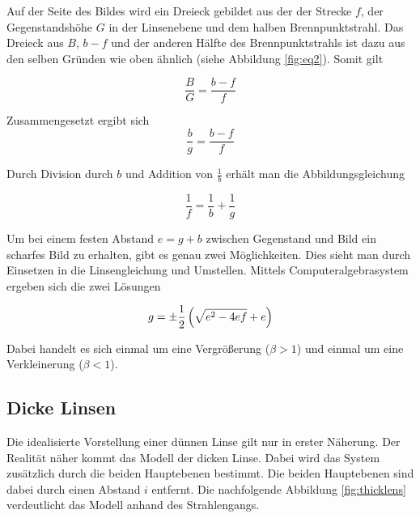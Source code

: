 \documentclass[a4paper,german,12pt,smallheadings]{scrartcl}
\begin{document}
Auf der Seite des Bildes wird ein Dreieck gebildet aus der der Strecke
$f$, der Gegenstandshöhe $G$ in der Linsenebene und dem halben
Brennpunktstrahl. Das Dreieck aus $B$, $b-f$ und der anderen Hälfte des
Brennpunktstrahls ist dazu aus den selben Gründen wie oben ähnlich (siehe
Abbildung \ref{fig:eq2}). Somit gilt

\begin{equation*}
  \frac{B}{G} = \frac{b-f}{f}
\end{equation*}

Zusammengesetzt ergibt sich
\begin{equation}
  \frac{b}{g} = \frac{b-f}{f}
  \label{eq:inter}
\end{equation}

Durch Division durch $b$ und Addition von $\frac{1}{b}$ erhält man die
Abbildungsgleichung

\begin{equation}
  \frac{1}{f} = \frac{1}{b} + \frac{1}{g}
\end{equation}

Um bei einem festen Abstand $e = g+b$ zwischen Gegenstand und Bild ein scharfes
Bild zu erhalten, gibt es genau zwei Möglichkeiten. Dies sieht man durch
Einsetzen in die Linsengleichung und Umstellen. Mittels Computeralgebrasystem
ergeben sich die zwei Lösungen

\begin{equation}
  g = \pm \frac{1}{2} \del{\sqrt{e^2 - 4ef} + e}
\end{equation}

Dabei handelt es sich einmal um eine Vergrößerung ($\beta > 1$) und einmal um
eine Verkleinerung ($\beta < 1$).


\subsection{Dicke Linsen}

Die idealisierte Vorstellung einer dünnen Linse gilt nur in erster Näherung.
Der Realität näher kommt das Modell der dicken Linse. Dabei wird das System
zusätzlich durch die beiden Hauptebenen bestimmt. Die beiden Hauptebenen sind
dabei durch einen Abstand $i$ entfernt. Die nachfolgende Abbildung
\ref{fig:thicklens} verdeutlicht das Modell anhand des Strahlengangs.
\end{document}
